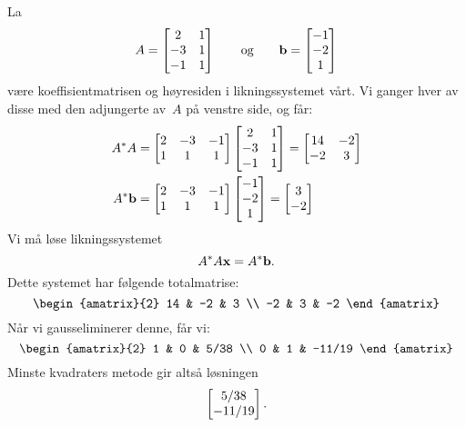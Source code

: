 \begin{losning}
\begin{punkt}
La
\[
A =
\begin{bmatrix}
 2 & 1 \\
-3 & 1 \\
-1 & 1
\end{bmatrix}
\qquad\text{og}\qquad
\mathbf{b} = \begin{bmatrix} -1 \\ -2 \\ 1 \end{bmatrix}
\]
være koeffisientmatrisen og høyresiden i likningssystemet vårt.  Vi
ganger hver av disse med den adjungerte av~$A$ på venstre side, og
får:
\begin{align*}
A^* A &=
\begin{bmatrix}
2 & -3 & -1 \\
1 &  1 &  1
\end{bmatrix}
\begin{bmatrix}
 2 & 1 \\
-3 & 1 \\
-1 & 1
\end{bmatrix}
=
\begin{bmatrix}
14 & -2 \\
-2 &  3
\end{bmatrix}
\\
A^* \mathbf{b} &=
\begin{bmatrix}
2 & -3 & -1 \\
1 &  1 &  1
\end{bmatrix}
\begin{bmatrix} -1 \\ -2 \\ 1 \end{bmatrix}
=
\begin{bmatrix} 3 \\ -2 \end{bmatrix}
\end{align*}
Vi må løse likningssystemet
\[
A^* A \mathbf{x} = A^* \mathbf{b}.
\]
Dette systemet har følgende totalmatrise:
\[
\begin{amatrix}{2}
14 & -2 &  3 \\
-2 &  3 & -2
\end{amatrix}
\]
Når vi gausseliminerer denne, får vi:
\[
\begin{amatrix}{2}
1 & 0 &   5/38 \\
0 & 1 & -11/19
\end{amatrix}
\]
Minste kvadraters metode gir altså løsningen
\[
\begin{bmatrix} 5/38 \\ -11/19 \end{bmatrix}.
\]
\end{punkt}


\end{losning}

